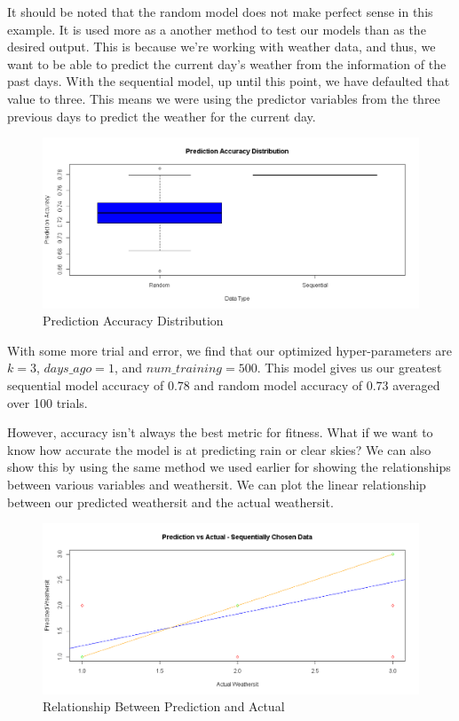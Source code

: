 \documentclass[12pt]{article}
\begin{document}
It should be noted that the random model does not make perfect sense in this example. It is used more as a another method to test our models than as the desired output. This is because we're working with weather data, and thus, we want to be able to predict the current day's weather from the information of the past days. With the sequential model, up until this point, we have defaulted that value to three. This means we were using the predictor variables from the three previous days to predict the weather for the current day.

\begin{figure}[H]
	\centering
  	\includegraphics[width=150mm]{"Prediction Accuracy Distribution"}
 	\caption{Prediction Accuracy Distribution}
 	\label{Prediction Accuracy Distribution}
\end{figure}

With some more trial and error, we find that our optimized hyper-parameters are $k = 3$, $days \_ ago = 1$, and $num \_ training = 500$. This model gives us our greatest sequential model accuracy of $0.78$ and random model accuracy of $0.73$ averaged over 100 trials.

However, accuracy isn't always the best metric for fitness. What if we want to know how accurate the model is at predicting rain or clear skies? We can also show this by using the same method we used earlier for showing the relationships between various variables and weathersit. We can plot the linear relationship between our predicted weathersit and the actual weathersit.

\begin{figure}[H]
	\centering
  	\includegraphics[width=150mm]{"Seq Pred"}
 	\caption{Relationship Between Prediction and Actual}
 	\label{Relationship Between Prediction and Actual}
\end{figure}
\end{document}
